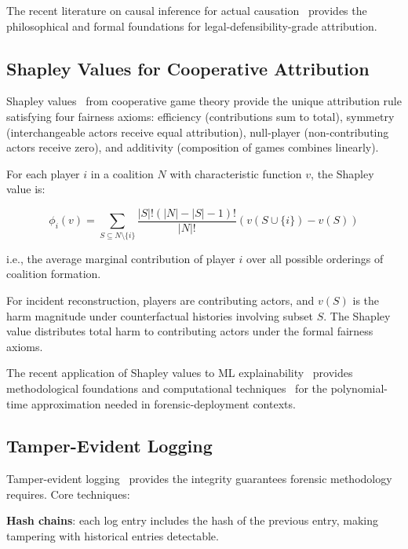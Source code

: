 \documentclass[sigconf,nonacm]{acmart}
\begin{document}
The recent literature on causal inference for actual
causation~\cite{halpern2024actualcause,gallese2024aclegal} provides
the philosophical and formal foundations for legal-defensibility-grade
attribution.

\subsection{Shapley Values for Cooperative Attribution}

Shapley values~\cite{shapley1953value} from cooperative game theory
provide the unique attribution rule satisfying four fairness axioms:
efficiency (contributions sum to total), symmetry (interchangeable
actors receive equal attribution), null-player (non-contributing
actors receive zero), and additivity (composition of games combines
linearly).

For each player $i$ in a coalition $N$ with characteristic function
$v$, the Shapley value is:

\begin{equation}
  \phi_i(v) = \sum_{S \subseteq N \setminus \{i\}} \frac{|S|! (|N|-|S|-1)!}{|N|!} (v(S \cup \{i\}) - v(S))
\end{equation}

i.e., the average marginal contribution of player $i$ over all
possible orderings of coalition formation.

For incident reconstruction, players are contributing actors,
and $v(S)$ is the harm magnitude under counterfactual histories
involving subset $S$. The Shapley value distributes total harm to
contributing actors under the formal fairness axioms.

The recent application of Shapley values to ML
explainability~\cite{lundberg2017shap,covert2024shapley} provides
methodological foundations and computational
techniques~\cite{jia2024approxshap} for the polynomial-time
approximation needed in forensic-deployment contexts.

\subsection{Tamper-Evident Logging}

Tamper-evident logging~\cite{schneier1999logging,
crosby2024merkleaudit} provides the integrity guarantees
forensic methodology requires. Core techniques:

\textbf{Hash chains}: each log entry includes the hash of the
previous entry, making tampering with historical entries
detectable.
\end{document}
